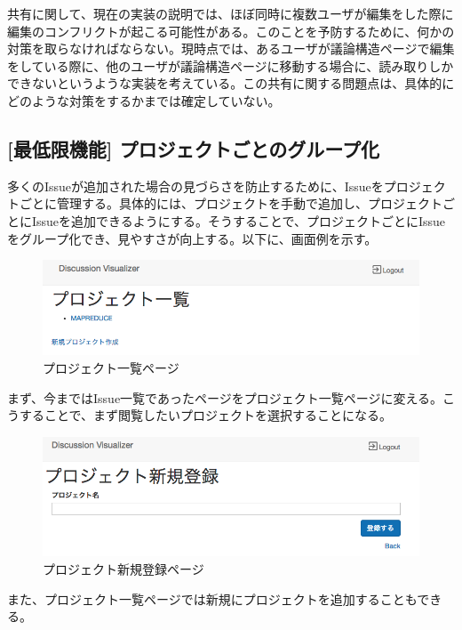 \documentclass[12pt, oneside]{jreport}
\begin{document}
		共有に関して、現在の実装の説明では、ほぼ同時に複数ユーザが編集をした際に編集のコンフリクトが起こる可能性がある。このことを予防するために、何かの対策を取らなければならない。現時点では、あるユーザが議論構造ページで編集をしている際に、他のユーザが議論構造ページに移動する場合に、読み取りしかできないというような実装を考えている。この共有に関する問題点は、具体的にどのような対策をするかまでは確定していない。
		
		\subsection{[最低限機能] プロジェクトごとのグループ化}
		多くのIssueが追加された場合の見づらさを防止するために、Issueをプロジェクトごとに管理する。具体的には、プロジェクトを手動で追加し、プロジェクトごとにIssueを追加できるようにする。そうすることで、プロジェクトごとにIssueをグループ化でき、見やすさが向上する。以下に、画面例を示す。
		
		\begin{figure}[H]
		\centering
		\includegraphics[width=17cm,bb=700 300 -200 27]{ProjectList.png}
		\caption{プロジェクト一覧ページ}
		\end{figure}
		
		まず、今まではIssue一覧であったページをプロジェクト一覧ページに変える。こうすることで、まず閲覧したいプロジェクトを選択することになる。
			
		\begin{figure}[H]
		\centering
		\includegraphics[width=17cm,bb=500 300 -200 27]{ProjectAdd.png}
		\caption{プロジェクト新規登録ページ}
		\end{figure}
		
		また、プロジェクト一覧ページでは新規にプロジェクトを追加することもできる。
		
\end{document}
